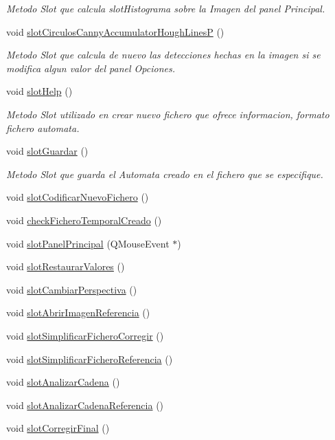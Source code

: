 \begin{DoxyCompactItemize}
\begin{DoxyCompactList}\small\item\em Metodo Slot que calcula slot\+Histograma sobre la Imagen del panel Principal. \end{DoxyCompactList}\item 
void \hyperlink{classCAplicacion_a96dd498717a483124d4809dcacc7d799}{slot\+Circulos\+Canny\+Accumulator\+Hough\+LinesP} ()
\begin{DoxyCompactList}\small\item\em Metodo Slot que calcula de nuevo las detecciones hechas en la imagen si se modifica algun valor del panel Opciones. \end{DoxyCompactList}\item 
void \hyperlink{classCAplicacion_afa58e4aea4d8ee05f361e457c9e678a2}{slot\+Help} ()
\begin{DoxyCompactList}\small\item\em Metodo Slot utilizado en crear nuevo fichero que ofrece informacion, formato fichero automata. \end{DoxyCompactList}\item 
void \hyperlink{classCAplicacion_aced2347df4a3174943aee7aaec4c8d2f}{slot\+Guardar} ()
\begin{DoxyCompactList}\small\item\em Metodo Slot que guarda el Automata creado en el fichero que se especifique. \end{DoxyCompactList}\item 
void \hyperlink{classCAplicacion_a0dce6cfe14c2fb5ece29c1f48d8b2568}{slot\+Codificar\+Nuevo\+Fichero} ()
\item 
void \hyperlink{classCAplicacion_a0325ad2888d69c8a6e58720e53a97143}{check\+Fichero\+Temporal\+Creado} ()
\item 
void \hyperlink{classCAplicacion_ac0ad710bb31f64f201d038889073fbcc}{slot\+Panel\+Principal} (Q\+Mouse\+Event $\ast$)
\item 
void \hyperlink{classCAplicacion_a4011e79de8ce2e33b70c4bd9bf237a25}{slot\+Restaurar\+Valores} ()
\item 
void \hyperlink{classCAplicacion_a1e74159f8323454a8cd881b2358fe58e}{slot\+Cambiar\+Perspectiva} ()
\item 
void \hyperlink{classCAplicacion_af5c1476262760c95128b7a65bfaa95e4}{slot\+Abrir\+Imagen\+Referencia} ()
\item 
void \hyperlink{classCAplicacion_a35566217464e87c1e579c49e2a779e4b}{slot\+Simplificar\+Fichero\+Corregir} ()
\item 
void \hyperlink{classCAplicacion_a30449da1425b45a9e8e74446d4c22c0a}{slot\+Simplificar\+Fichero\+Referencia} ()
\item 
void \hyperlink{classCAplicacion_a790aa4d7eb5a09d08e6613f26f625353}{slot\+Analizar\+Cadena} ()
\item 
void \hyperlink{classCAplicacion_a0f5e400c5098ad21794673969efc2277}{slot\+Analizar\+Cadena\+Referencia} ()
\item 
void \hyperlink{classCAplicacion_a844abc173c7b450ddc9eb3fc2cef6f3a}{slot\+Corregir\+Final} ()
\end{DoxyCompactItemize}
